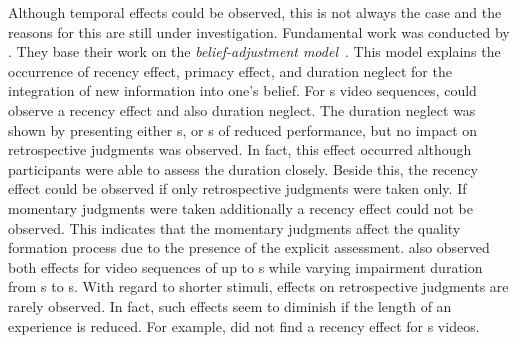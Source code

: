 Although temporal effects could be observed, this is not always the case and the reasons for this are still under investigation.
Fundamental work was conducted by \citet{hands_recency_2001}.
They base their work on the \emph{belief-adjustment model}~\citep{hogarth_order_1992}.
This model explains the occurrence of recency effect, primacy effect, and duration neglect for the integration of new information into one's belief. %
For \unit[30]{s} video sequences, \citet{hands_recency_2001} could observe a recency effect and also duration neglect.
The duration neglect was shown by presenting either \unit[5]{s}, or \unit[10]{s} of reduced performance, but no impact on retrospective judgments was observed.
In fact, this effect occurred although participants were able to assess the duration closely. %
Beside this, the recency effect could be observed if only retrospective judgments were taken only.
If momentary judgments were taken additionally a recency effect could not be observed.
This indicates that the momentary judgments affect the quality formation process due to the presence of the explicit assessment.
\citet{hamberg_time-varying_1999} also observed both effects for video sequences of up to \unit[180]{s} while varying impairment duration from \unit[2]{s} to \unit[10]{s}.
With regard to shorter stimuli, effects on retrospective judgments are rarely observed.
In fact, such effects seem to diminish if the length of an experience is reduced.
For example, \citet{ninassi_considering_2009} did not find a recency effect for \unit[8]{s} videos.

